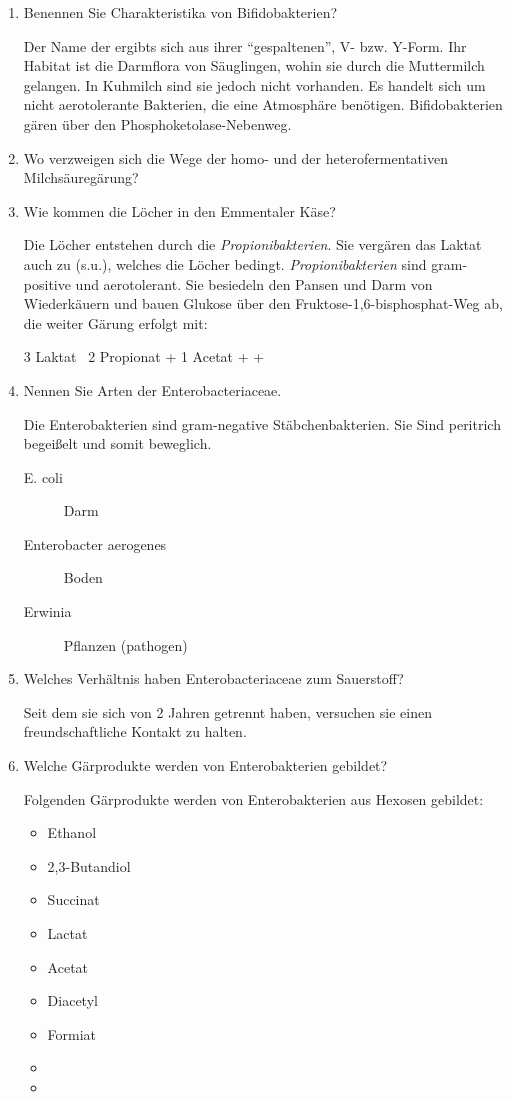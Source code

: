 \begin{enumerate}
	\item Benennen Sie Charakteristika von Bifidobakterien?
		
		Der Name der ergibts sich aus ihrer ``gespaltenen'', V- bzw. Y-Form.
		Ihr Habitat ist die Darmflora von Säuglingen,
		wohin sie durch die Muttermilch gelangen.
		In Kuhmilch sind sie jedoch nicht vorhanden.
		Es handelt sich um nicht aerotolerante Bakterien,
		die eine  Atmosphäre benötigen.
		Bifidobakterien gären über den Phosphoketolase-Nebenweg.

	\item Wo verzweigen sich die Wege der homo- und der heterofermentativen Milchsäuregärung?
	\item Wie kommen die Löcher in den Emmentaler Käse?

		Die Löcher entstehen durch die \emph{Propionibakterien}.
		Sie vergären das Laktat auch zu  (s.u.),
		welches die Löcher bedingt.
		\emph{Propionibakterien} sind gram-positive und	aerotolerant.
		Sie besiedeln den Pansen und Darm von Wiederkäuern und bauen Glukose über den
		Fruktose-1,6-bisphosphat-Weg ab, die weiter Gärung erfolgt mit:
		
		3 Laktat \textrightarrow \ 2 Propionat + 1 Acetat +  + 

	\item Nennen Sie Arten der Enterobacteriaceae.

		Die Enterobakterien sind gram-negative Stäbchenbakterien.
		Sie Sind peritrich begeißelt und somit beweglich.

		\begin{description}
			\item[E. coli] Darm
			\item[Enterobacter aerogenes] Boden
			\item[Erwinia] Pflanzen (pathogen)
		\end{description}

	\item Welches Verhältnis haben Enterobacteriaceae zum Sauerstoff?

		Seit dem sie sich von 2 Jahren getrennt haben, versuchen sie einen freundschaftliche Kontakt zu halten.

	\item Welche Gärprodukte werden von Enterobakterien gebildet?

		Folgenden Gärprodukte werden von Enterobakterien aus Hexosen gebildet:
		\begin{itemize}
			\item Ethanol
			\item 2,3-Butandiol
			\item Succinat
			\item Lactat
			\item Acetat
			\item Diacetyl
			\item Formiat
			\item {}
			\item {}
		\end{itemize}


\end{enumerate}
